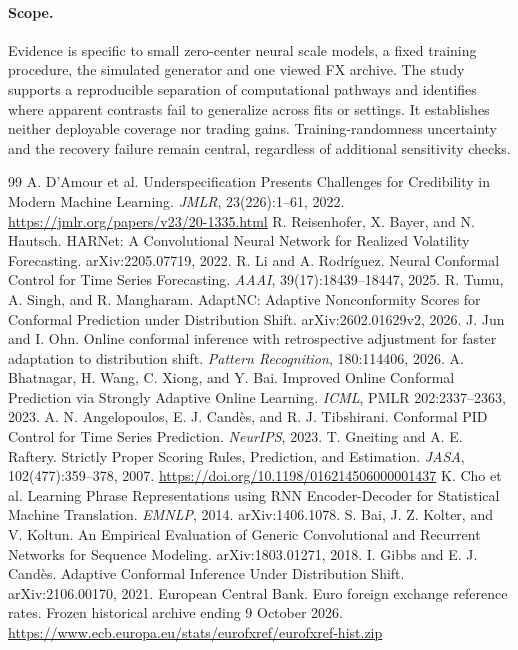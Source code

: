 \documentclass{article}
\begin{document}
\paragraph{Scope.}
Evidence is specific to small zero-center neural scale models, a fixed
training procedure, the simulated generator and one viewed FX archive.
The study supports a reproducible separation of computational pathways and
identifies where apparent contrasts fail to generalize across fits or
settings. It establishes neither deployable coverage nor trading gains.
Training-randomness uncertainty and the recovery failure remain central,
regardless of additional sensitivity checks.

\clearpage
\begingroup
\raggedright
\begin{thebibliography}{99}
A. D'Amour et al. Underspecification Presents Challenges for Credibility in
Modern Machine Learning. \emph{JMLR}, 23(226):1--61, 2022.
\url{https://jmlr.org/papers/v23/20-1335.html}
R. Reisenhofer, X. Bayer, and N. Hautsch. HARNet: A Convolutional Neural
Network for Realized Volatility Forecasting. arXiv:2205.07719, 2022.
R. Li and A. Rodr\'iguez. Neural Conformal Control for Time Series
Forecasting. \emph{AAAI}, 39(17):18439--18447, 2025.
R. Tumu, A. Singh, and R. Mangharam. AdaptNC: Adaptive Nonconformity Scores
for Conformal Prediction under Distribution Shift. arXiv:2602.01629v2, 2026.
J. Jun and I. Ohn. Online conformal inference with retrospective adjustment
for faster adaptation to distribution shift.
\emph{Pattern Recognition}, 180:114406, 2026.
A. Bhatnagar, H. Wang, C. Xiong, and Y. Bai.
Improved Online Conformal Prediction via Strongly Adaptive Online Learning.
\emph{ICML}, PMLR 202:2337--2363, 2023.
A. N. Angelopoulos, E. J. Cand\`es, and R. J. Tibshirani.
Conformal PID Control for Time Series Prediction. \emph{NeurIPS}, 2023.
T. Gneiting and A. E. Raftery. Strictly Proper Scoring Rules, Prediction,
and Estimation. \emph{JASA}, 102(477):359--378, 2007.
\url{https://doi.org/10.1198/016214506000001437}
K. Cho et al. Learning Phrase Representations using RNN Encoder-Decoder
for Statistical Machine Translation. \emph{EMNLP}, 2014. arXiv:1406.1078.
S. Bai, J. Z. Kolter, and V. Koltun. An Empirical Evaluation of Generic
Convolutional and Recurrent Networks for Sequence Modeling.
arXiv:1803.01271, 2018.
I. Gibbs and E. J. Cand\`es. Adaptive Conformal Inference Under
Distribution Shift. arXiv:2106.00170, 2021.
European Central Bank. Euro foreign exchange reference rates.
Frozen historical archive ending 9 October 2026.
\url{https://www.ecb.europa.eu/stats/eurofxref/eurofxref-hist.zip}
\end{thebibliography}
\endgroup
\end{document}
